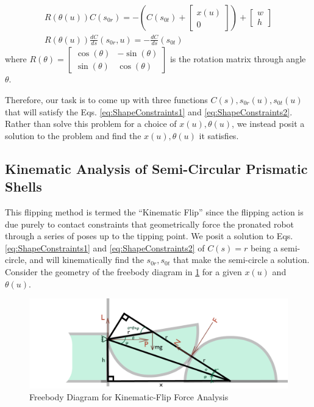 \documentclass[letterpaper, 10 pt, conference]{ieeeconf}
\begin{document}
\begin{align}
  R(\theta(u) ) C(s_{0r}) = - \left(C(s_{0t})+\begin{bmatrix}x(u) \\ 0\end{bmatrix} \right) +\begin{bmatrix}w \\ h\end{bmatrix} \label{eq:ShapeConstraints1} \\
  R(\theta(u) ) \frac{d C}{d s}(s_{0r},u) = - \frac{d C}{d s}(s_{0t})
  \label{eq:ShapeConstraints2}
\end{align}
where $R(\theta) = \begin{bmatrix} \cos(\theta) & -\sin(\theta) \\ \sin(\theta) & \cos(\theta) \end{bmatrix}$ is the rotation matrix through angle $\theta$.

Therefore, our task is to come up with three functions $C(s), s_{0r}(u), s_{0t}(u)$ that will satisfy the Eqs. \ref{eq:ShapeConstraints1} and \ref{eq:ShapeConstraints2}.
Rather than solve this problem for a choice of $x(u), \theta(u)$, we instead posit a solution to the problem and find the $x(u),\theta(u)$ it satisfies.

\subsection{Kinematic Analysis of Semi-Circular Prismatic Shells}
This flipping method is termed the ``Kinematic Flip'' since the flipping action is due purely to contact constraints that geometrically force the pronated robot through a series of poses up to the tipping point.
We posit a solution to Eqs. \ref{eq:ShapeConstraints1} and \ref{eq:ShapeConstraints2} of $C(s) = r$ being a semi-circle, and will kinematically find the $s_{0r}, s_{0t}$ that make the semi-circle a solution.
Consider the geometry of the freebody diagram in \ref{fig:KinFreebody} for a given $x(u)$ and $\theta(u)$.

\begin{figure}[ht]
\centering
\includegraphics[width=0.8\columnwidth]{Kin_FreeBodyDiagram.png}
\caption{\label{fig:KinFreebody}Freebody Diagram for Kinematic-Flip Force Analysis}
\end{figure}
\end{document}
